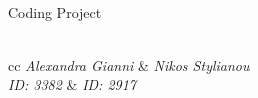 \documentclass[a4paper,12pt]{article}
\begin{document}
\begin{titlepage}
		\HRule \\[0.5cm]
		{ \huge Coding Project}\\[0.4cm] %
		\HRule \\[1.8cm]
		
		
		
		\vspace*{1cm}
		\begin{minipage}{\textwidth}
			\centering
			\begin{tblr}{cc}
				 \emph{{\LARGE Alexandra Gianni}} & \emph{{\LARGE Nikos Stylianou}} \\ [3mm]
				 \emph{{\LARGE ID: 3382}} & \emph{{\LARGE ID: 2917}} \\
			\end{tblr}
		\end{minipage}\\[2.5cm]
		
		
		
		
		
	\end{titlepage}
	
	\tableofcontents
	\newpage
	
	
	
	
	
	\newpage
	\nocite{*}
	
	
	
\end{document}
